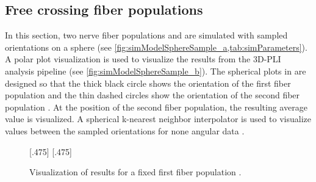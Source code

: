 \subsection{Free crossing fiber populations}
\label{sec:resFreeCross}
%
In this section, two nerve fiber populations \popa{} and \popb{} are simulated with sampled orientations on a sphere (see \cref{fig:simModelSphereSample_a,tab:simParameters}).
A polar plot visualization is used to visualize the results from the \ac{3D-PLI} analysis pipeline (see \cref{fig:simModelSphereSample_b}).
The spherical plots in %
are designed so that the thick black circle shows the orientation of the first fiber population \popa{} and the thin dashed circles show the orientation of the second fiber population \popb{}.
At the position of the second fiber population, the resulting average value is visualized.
A spherical k-nearest neighbor interpolator is used to visualize values between the sampled orientations for none angular data \cite{DBLP:journals/corr/abs-1910-00704}.
\par
% 
\begin{figure}[!t]
\centering
\setlength{\tikzwidth}{0.40\textwidth}
[.475\textwidth]{}
\hfill
{}
[.475\textwidth]{}
\caption{Visualization of results for a fixed first fiber population \popa{}.}
\label{fig:simModelSphereSample}
\end{figure}
%
%
%
